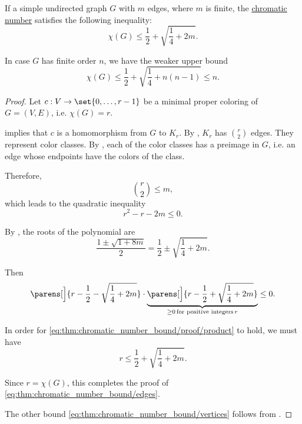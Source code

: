 \begin{proposition}\label{thm:chromatic_number_bound}
  If a simple undirected graph \( G \) with \( m \) edges, where \( m \) is finite, the \hyperref[def:graph_chromatic_number]{chromatic number} satisfies the following inequality:
  \begin{equation}\label{eq:thm:chromatic_number_bound/edges}
    \chi(G) \leq \frac 1 2 + \sqrt{ \frac 1 4 + 2m }.
  \end{equation}

  In case \( G \) has finite order \( n \), we have the weaker upper bound
  \begin{equation}\label{eq:thm:chromatic_number_bound/vertices}
    \chi(G) \leq \frac 1 2 + \sqrt{ \frac 1 4 + n(n - 1) } \leq n.
  \end{equation}
\end{proposition}
\begin{proof}
  Let \( c: V \to \set{ 0, \ldots, r - 1 } \) be a minimal proper coloring of \( G = (V, E) \), i.e. \( \chi(G) = r \).

   implies that \( c \) is a homomorphism from \( G \) to \( K_r \). By , \( K_r \) has \( \binom r 2 \) edges. They represent color classes. By , each of the color classes has a preimage in \( G \), i.e. an edge whose endpoints have the colors of the class.

  Therefore,
  \begin{equation*}
    \binom r 2 \leq m,
  \end{equation*}
  which leads to the quadratic inequality
  \begin{equation*}
    r^2 - r - 2m \leq 0.
  \end{equation*}

  By , the roots of the polynomial are
  \begin{equation*}
    \frac { 1 \pm \sqrt{ 1 + 8m } } 2 = \frac 1 2 \pm \sqrt{ \frac 1 4 + 2m }.
  \end{equation*}

  Then
  \begin{equation}\label{eq:thm:chromatic_number_bound/proof/product}
    \parens[\Big]{ r - \frac 1 2 - \sqrt{ \frac 1 4 + 2m } } \cdot \underbrace{\parens[\Big]{ r - \frac 1 2 + \sqrt{ \frac 1 4 + 2m } }}_{\geq 0 \T*{for positive integers} r} \leq 0.
  \end{equation}

  In order for \eqref{eq:thm:chromatic_number_bound/proof/product} to hold, we must have
  \begin{equation*}
    r \leq \frac 1 2 + \sqrt{ \frac 1 4 + 2m }.
  \end{equation*}

  Since \( r = \chi(G) \), this completes the proof of \eqref{eq:thm:chromatic_number_bound/edges}.

  The other bound \eqref{eq:thm:chromatic_number_bound/vertices} follows from .
\end{proof}

